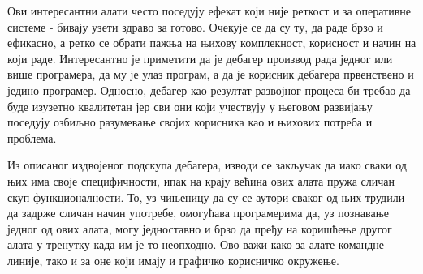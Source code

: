 \documentclass[a4paper]{article}
\begin{document}
Ови интересантни алати често поседују ефекат који
није реткост и за оперативне системе - бивају узети здраво за готово.
Очекује се да су ту, да раде брзо и ефикасно, а ретко се 
обрати пажња на њихову комплекност,
корисност и начин на који раде. Интересантно је приметити 
да је дебагер производ рада једног или више
програмера, да му је улаз програм, а да је корисник 
дебагера првенствено и једино програмер.
Односно, дебагер као резултат развојног процеса 
би требао да буде изузетно квалитетан јер сви они
који учествују у његовом развијању поседују озбиљно 
разумевање својих корисника као и њихових
потреба и проблема.

Из описаног издвојеног подскупа дебагера, 
изводи се закључак да иако сваки од њих има своје 
специфичности, ипак на крају већина ових алата пружа
сличан скуп функционалности. То, уз чињеницу да су
се аутори сваког од њих трудили да задрже сличан начин
употребе, омогућава програмерима
да, уз познавање једног од ових алата, могу једноставно и брзо
да пређу на коришћење другог алата у тренутку када им
је то неопходно. Ово важи како за алате командне линије, 
тако и за оне који имају и графичко корисничко окружење.

\newpage

\appendix
 

\end{document}
